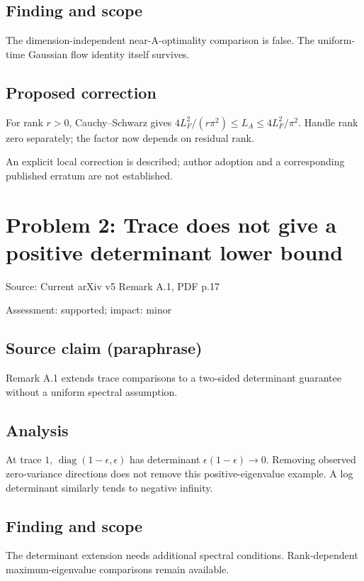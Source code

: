 \documentclass[11pt]{article}
\begin{document}
\subsection*{Finding and scope}

The dimension-independent near-A-optimality comparison is false. The uniform-time Gaussian flow identity itself survives.

\subsection*{Proposed correction}

For rank \(r>0\), Cauchy–Schwarz gives \(4L_F^2/(r\pi^2)\leq L_A\leq4L_F^2/\pi^2\). Handle rank zero separately; the factor now depends on residual rank.

An explicit local correction is described; author adoption and a corresponding published erratum are not established.

\section*{Problem 2: Trace does not give a positive determinant lower bound}

Source: Current arXiv v5 Remark A.1, PDF p.17

Assessment: supported; impact: minor

\subsection*{Source claim (paraphrase)}

Remark A.1 extends trace comparisons to a two-sided determinant guarantee without a uniform spectral assumption.

\subsection*{Analysis}

At trace \(1\), \(\operatorname{diag}(1-\epsilon,\epsilon)\) has determinant \(\epsilon(1-\epsilon)\to0\). Removing observed zero-variance directions does not remove this positive-eigenvalue example. A log determinant similarly tends to negative infinity.

\subsection*{Finding and scope}

The determinant extension needs additional spectral conditions. Rank-dependent maximum-eigenvalue comparisons remain available.
\end{document}
